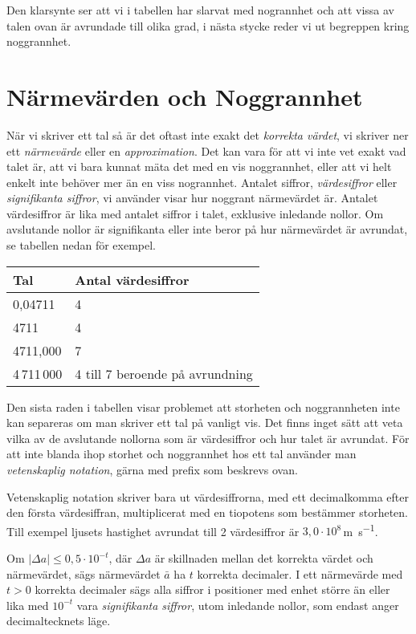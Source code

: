 \bigskip

Den klarsynte ser att vi i tabellen har slarvat med nogrannhet och att
vissa av talen ovan är avrundade till olika grad, i nästa stycke reder
vi ut begreppen kring noggrannhet.

\section{Närmevärden och Noggrannhet}

När vi skriver ett tal så är det oftast inte exakt det \emph{korrekta
värdet}, vi skriver ner ett \emph{närmevärde} eller en
\emph{approximation}.  Det kan vara för att vi inte vet exakt vad
talet är, att vi bara kunnat mäta det med en vis noggrannhet, eller
att vi helt enkelt inte behöver mer än en viss nogrannhet. Antalet
siffror, \emph{värdesiffror} eller \emph{signifikanta siffror}, vi
använder visar hur noggrant närmevärdet är.  Antalet värdesiffror är
lika med antalet siffror i talet, exklusive inledande nollor.  Om
avslutande nollor är signifikanta eller inte beror på hur närmevärdet
är avrundat, se tabellen nedan för exempel.

\bigskip
\begin{centering}
\begin{tabular}{|l|l|}
\hline
Tal & Antal värdesiffror \\
\hline
0,04711 & 4\\
4711 & 4 \\
4711,000 & 7 \\
4\,711\,000 & 4 till 7 beroende på avrundning \\
\hline
\end{tabular}
\end{centering}
\bigskip

Den sista raden i tabellen visar problemet att storheten och
noggrannheten inte kan separeras om man skriver ett tal på vanligt
vis. Det finns inget sätt att veta vilka av de avslutande nollorna som
är värdesiffror och hur talet är avrundat.  För att inte blanda ihop
storhet och noggrannhet hos ett tal använder man \emph{vetenskaplig
notation}, gärna med prefix som beskrevs ovan.

Vetenskaplig notation skriver bara ut värdesiffrorna, med ett
decimalkomma efter den första värdesiffran, multiplicerat med en
tiopotens som bestämmer storheten. Till exempel ljusets hastighet
avrundat till 2 värdesiffror är $3,0 \cdot 10^8$\,\si{\metre\per\second}.

Om $|\Delta a|\leq 0,5\cdot 10^{-t}$, där $\Delta a$ är skillnaden
mellan det korrekta värdet och närmevärdet, sägs närmevärdet $\bar
{a}$ ha $t$ korrekta decimaler.
I ett närmevärde med $t>0$ korrekta decimaler sägs alla siffror i
positioner med enhet större än eller lika med $10^{-t}$ vara
\emph{signifikanta siffror}, utom inledande nollor, som endast anger
decimaltecknets läge.

